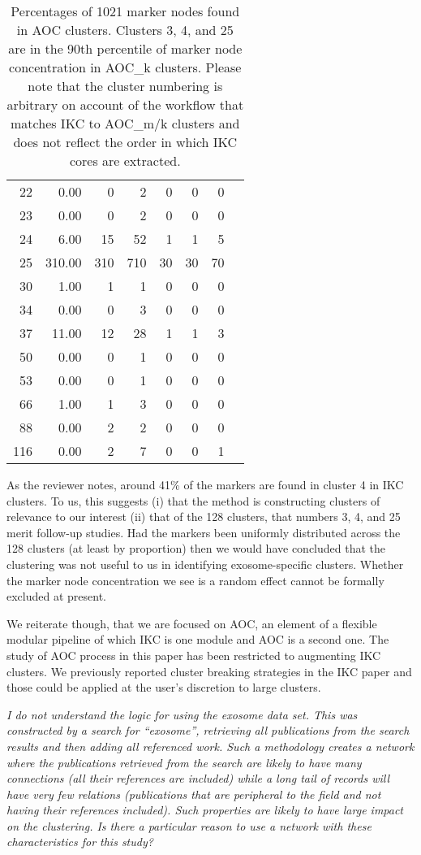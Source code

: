 \documentclass[11pt, oneside]{article}   	%
\begin{document}
\begin{table}[ht]
\begin{tabular}{rrrrrrrr}
22 & 0.00 &   0 &   2 &   0 &   0 &   0 \\ 
23 & 0.00 &   0 &   2 &   0 &   0 &   0 \\ 
24 & 6.00 &  15 &  52 &   1 &   1 &   5 \\ 
25 & 310.00 & 310 & 710 &  30 &  30 &  70 \\ 
30 & 1.00 &   1 &   1 &   0 &   0 &   0 \\ 
34 & 0.00 &   0 &   3 &   0 &   0 &   0 \\ 
37 & 11.00 &  12 &  28 &   1 &   1 &   3 \\ 
50 & 0.00 &   0 &   1 &   0 &   0 &   0 \\ 
53 & 0.00 &   0 &   1 &   0 &   0 &   0 \\ 
66 & 1.00 &   1 &   3 &   0 &   0 &   0 \\ 
88 & 0.00 &   2 &   2 &   0 &   0 &   0 \\ 
116 & 0.00 &  2 &   7 &   0 &   0 &   1 \\ 
   \hline
\end{tabular}
\caption{Percentages of 1021 marker nodes found in AOC clusters. Clusters 3, 4, and 25 are in the 90th percentile of marker node concentration in AOC\_k clusters. Please note that the cluster numbering is arbitrary on account of the workflow that matches IKC to AOC\_m/k clusters and does not reflect the order in which IKC cores are extracted.}
\end{table}

As the reviewer notes, around 41\% of the markers are found in cluster 4 in IKC clusters. To us, this suggests (i) that the method is constructing clusters of relevance to our interest
(ii) that of the 128 clusters, that numbers 3, 4, and 25 merit follow-up studies. Had the markers been uniformly distributed across the 128 clusters (at least by proportion) then we
would have concluded that the clustering was not useful to us in identifying exosome-specific clusters. Whether the marker node concentration we see is a random effect cannot be formally excluded at present.

We reiterate though, that we are focused on AOC, an element of a flexible modular pipeline of which IKC is one module and AOC is a second one. The study of AOC process in this paper has been restricted 
to augmenting IKC clusters. We previously reported cluster breaking strategies in the IKC paper and those could be applied at the user's discretion to large clusters.

\emph{I do not understand the logic for using the exosome data set. This was constructed by a search for “exosome”, retrieving all publications from the search results and then adding all referenced work. Such a methodology creates a network where the publications retrieved from the search are likely to have many connections (all their references are included) while a long tail of records will have very few relations (publications that are peripheral to the field and not having their references included). Such properties are likely to have large impact on the clustering. Is there a particular reason to use a network with these characteristics for this study?}
\end{document}
